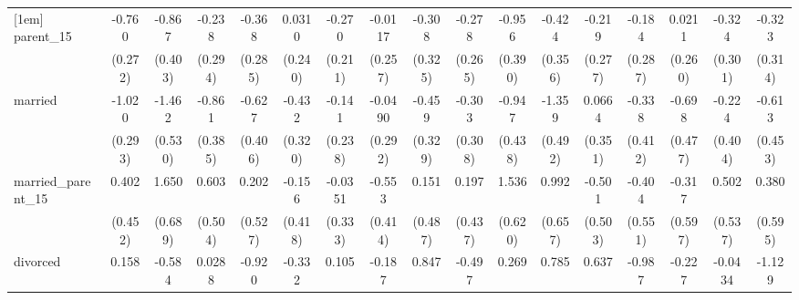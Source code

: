 {\begin{tabular}{l*{16}{c}}
[1em]
parent\_15           &      -0.760\sym{**} &      -0.867\sym{*}  &      -0.238         &      -0.368         &      0.0310         &      -0.270         &     -0.0117         &      -0.308         &      -0.278         &      -0.956\sym{*}  &      -0.424         &      -0.219         &      -0.184         &      0.0211         &      -0.324         &      -0.323         \\
                    &     (0.272)         &     (0.403)         &     (0.294)         &     (0.285)         &     (0.240)         &     (0.211)         &     (0.257)         &     (0.325)         &     (0.265)         &     (0.390)         &     (0.356)         &     (0.277)         &     (0.287)         &     (0.260)         &     (0.301)         &     (0.314)         \\
[1em]
married             &      -1.020\sym{***}&      -1.462\sym{**} &      -0.861\sym{*}  &      -0.627         &      -0.432         &      -0.141         &     -0.0490         &      -0.459         &      -0.303         &      -0.947\sym{*}  &      -1.359\sym{**} &      0.0664         &      -0.338         &      -0.698         &      -0.224         &      -0.613         \\
                    &     (0.293)         &     (0.530)         &     (0.385)         &     (0.406)         &     (0.320)         &     (0.238)         &     (0.292)         &     (0.329)         &     (0.308)         &     (0.438)         &     (0.492)         &     (0.351)         &     (0.412)         &     (0.477)         &     (0.404)         &     (0.453)         \\
[1em]
married\_parent\_15   &       0.402         &       1.650\sym{*}  &       0.603         &       0.202         &      -0.156         &     -0.0351         &      -0.553         &       0.151         &       0.197         &       1.536\sym{*}  &       0.992         &      -0.501         &      -0.404         &      -0.317         &       0.502         &       0.380         \\
                    &     (0.452)         &     (0.689)         &     (0.504)         &     (0.527)         &     (0.418)         &     (0.333)         &     (0.414)         &     (0.487)         &     (0.437)         &     (0.620)         &     (0.657)         &     (0.503)         &     (0.551)         &     (0.597)         &     (0.537)         &     (0.595)         \\
[1em]
divorced            &       0.158         &      -0.584         &      0.0288         &      -0.920         &      -0.332         &       0.105         &      -0.187         &       0.847\sym{*}  &      -0.497         &       0.269         &       0.785         &       0.637         &      -0.987         &      -0.227         &     -0.0434         &      -1.129         \\

\end{tabular}}
